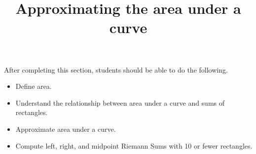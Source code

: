 \documentclass{ximera}
\title{Approximating the area under a curve}
\begin{document}
\begin{abstract}
\end{abstract}

\maketitle

\begin{sectionOutcomes}

After completing this section, students should be able to do the following.

\begin{itemize}
	\item Define area.
	\item Understand the relationship between area under a curve and sums of rectangles.
	\item Approximate area under a curve.
	\item Compute left, right, and midpoint Riemann Sums with 10 or fewer rectangles.
\end{itemize}

\end{sectionOutcomes}
\end{document}
